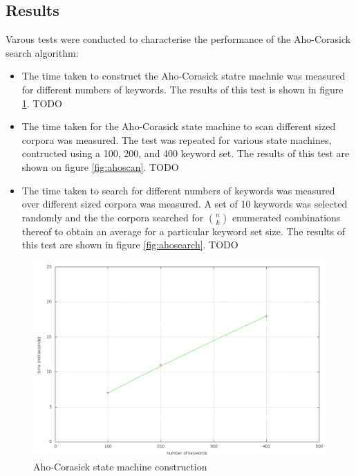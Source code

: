 \documentclass[10pt]{report}
\begin{document}
\subsection*{Results}
Varous tests were conducted to characterise the performance of the Aho-Corasick search algorithm:

\begin{itemize}
\item The time taken to construct the Aho-Corasick statre machnie was measured for different numbers of keywords. The results of this test is shown in figure \ref{fig:ahostatemachine}. TODO

\item The time taken for the Aho-Corasick state machine to scan different sized corpora was measured. The test was repeated for various state machines, contructed using a 100, 200, and 400 keyword set. The results of this test are shown on figure \ref{fig:ahoscan}. TODO

\item The time taken to search for different numbers of keywords was measured over different sized corpora was measured. A set of 10 keywords was selected randomly and the the corpora searched for ${n \choose k}$ enumerated combinations thereof to obtain an average for a particular keyword set size. The results of this test are shown in figure \ref{fig:ahosearch}. TODO
\end{itemize}


\begin{figure}
  \begin{center}
	\includegraphics[width=\textwidth,height=!]{ahostatemachine}
  \end{center}
  \caption{Aho-Corasick state machine construction}
  \label{fig:ahostatemachine}
\end{figure} 
\end{document}

